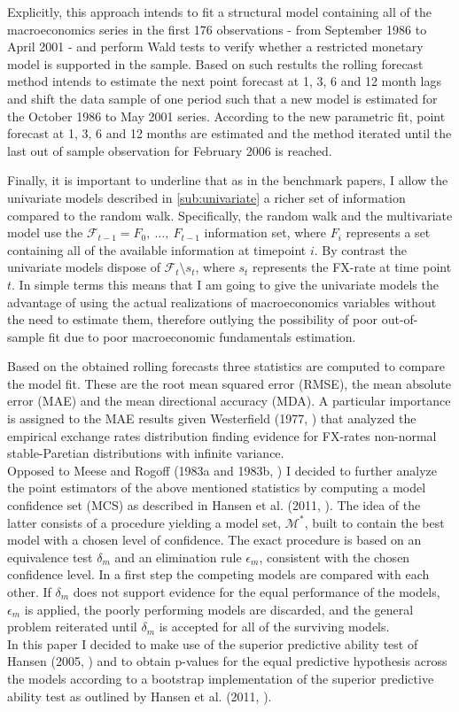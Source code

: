 Explicitly, this approach intends to fit a structural model containing
all of the macroeconomics series in the first 176 observations - from
September 1986 to April 2001 - and perform Wald tests to verify
whether a restricted monetary model is supported in the sample. Based
on such restults the rolling forecast method intends to estimate the
next point forecast at 1, 3, 6 and 12 month lags and shift the data
sample of one period such that a new model is estimated for the
October 1986 to May 2001 series. According to the new parametric fit,
point forecast at 1, 3, 6 and 12 months are estimated and the method
iterated until the last out of sample observation for February 2006 is
reached.

Finally, it is important to underline that as in the benchmark papers,
I allow the univariate models described in \ref{sub:univariate} a
richer set of information compared to the random walk.  Specifically,
the random walk and the multivariate model use the
$\mathscr{F}_{t-1} = {F_0, \ \dots, \ F_{t-1}}$ information set, where
$F_i$ represents a set containing all of the available information at
timepoint $i$.  By contrast the univariate models dispose of
$\mathscr{F}_t \setminus s_t$, where $s_t$ represents the FX-rate at
time point $t$.  In simple terms this means that I am going to give
the univariate models the advantage of using the actual realizations
of macroeconomics variables without the need to estimate them,
therefore outlying the possibility of poor out-of-sample fit due to
poor macroeconomic fundamentals estimation.

Based on the obtained rolling forecasts three statistics are computed
to compare the model fit.  These are the root mean squared error
(RMSE), the mean absolute error (MAE) and the mean directional
accuracy (MDA).  A particular importance is assigned to the MAE
results given Westerfield (1977, \cite{Westerfield}) that analyzed the
empirical exchange rates distribution finding evidence for FX-rates
non-normal stable-Paretian distributions with infinite variance.\\
Opposed to Meese and Rogoff (1983a and 1983b, \cite{MeeseRogoffa,
  MeeseRogoffb}) I decided to further analyze the point estimators of
the above mentioned statistics by computing a model confidence set
(MCS) as described in Hansen et al. (2011, \cite{HansenMCS}).  The
idea of the latter consists of a procedure yielding a model set,
$\mathcal{M}^*$, built to contain the best model with a chosen level
of confidence. The exact procedure is based on an equivalence test
$\delta_m$ and an elimination rule $\epsilon_m$, consistent with the
chosen confidence level. In a first step the competing models are
compared with each other. If $\delta_m$ does not support evidence for
the equal performance of the models, $\epsilon_m$ is applied, the
poorly performing models are discarded, and the general problem
reiterated until $\delta_m$ is accepted
for all of the surviving models.\\
In this paper I decided to make use of the superior predictive ability
test of Hansen (2005, \cite{HansenSPA}) and to obtain p-values for the
equal predictive hypothesis across the models according to a bootstrap
implementation of the superior predictive ability test as outlined by
Hansen et al. (2011, \cite{HansenMCS}).
